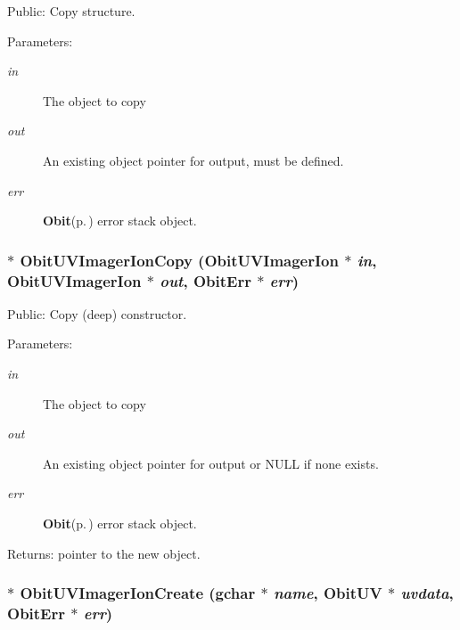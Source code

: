 Public: Copy structure. 

\begin{Desc}
\item[Parameters:]
\begin{description}
\item[{\em in}]The object to copy \item[{\em out}]An existing object pointer for output, must be defined. \item[{\em err}]{\bf Obit}{\rm (p.\,\pageref{structObit})} error stack object. \end{description}
\end{Desc}
\subsubsection{$\ast$ Obit\-UVImager\-Ion\-Copy ({\bf Obit\-UVImager\-Ion} $\ast$ {\em in}, {\bf Obit\-UVImager\-Ion} $\ast$ {\em out}, {\bf Obit\-Err} $\ast$ {\em err})}\label{ObitUVImagerIon_8c_a9}


Public: Copy (deep) constructor. 

\begin{Desc}
\item[Parameters:]
\begin{description}
\item[{\em in}]The object to copy \item[{\em out}]An existing object pointer for output or NULL if none exists. \item[{\em err}]{\bf Obit}{\rm (p.\,\pageref{structObit})} error stack object. \end{description}
\end{Desc}
\begin{Desc}
\item[Returns:]pointer to the new object. \end{Desc}
\subsubsection{$\ast$ Obit\-UVImager\-Ion\-Create (gchar $\ast$ {\em name}, {\bf Obit\-UV} $\ast$ {\em uvdata}, {\bf Obit\-Err} $\ast$ {\em err})}\label{ObitUVImagerIon_8c_a11}


